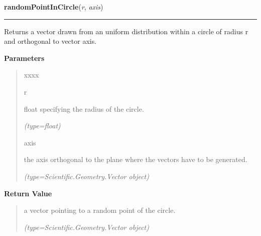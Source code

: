     \label{nMOLDYN:Core:Mathematics:randomPointInCircle}

    \vspace{0.5ex}

\hspace{.8\funcindent}\begin{boxedminipage}{\funcwidth}

    \raggedright \textbf{randomPointInCircle}(\textit{r}, \textit{axis})

    \vspace{-1.5ex}

    \rule{\textwidth}{0.5\fboxrule}
\setlength{\parskip}{2ex}
    Returns a vector drawn from an uniform distribution within a circle of 
    radius {\textbar}r{\textbar} and orthogonal to vector 
    {\textbar}axis{\textbar}.

\setlength{\parskip}{1ex}
      \textbf{Parameters}
      \vspace{-1ex}

      \begin{quote}
        \begin{Ventry}{xxxx}

          \item[r]

          float specifying the radius of the circle.

            {\it (type=float)}

          \item[axis]

          the axis orthogonal to the plane where the vectors have to be 
          generated.

            {\it (type=Scientific.Geometry.Vector object)}

        \end{Ventry}

      \end{quote}

      \textbf{Return Value}
    \vspace{-1ex}

      \begin{quote}
      a vector pointing to a random point of the circle.

      {\it (type=Scientific.Geometry.Vector object)}

      \end{quote}

    \end{boxedminipage}

